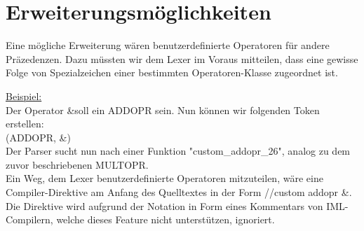 \documentclass[../main.tex]{subfiles}
\begin{document}
\section{Erweiterungsmöglichkeiten}

\vspace{10pt}

Eine mögliche Erweiterung wären benutzerdefinierte Operatoren für andere Präzedenzen. Dazu müssten wir dem Lexer im Voraus mitteilen, dass eine gewisse Folge von Spezialzeichen einer bestimmten Operatoren-Klasse zugeordnet ist. \\

\vspace{10pt}

\underline{Beispiel:} \\

Der Operator \dq\&\dq soll ein ADDOPR sein. Nun können wir folgenden Token erstellen: \\ 

(ADDOPR, \dq\&\dq) \\

Der Parser sucht nun nach einer Funktion "custom\_addopr\_26", analog zu dem zuvor beschriebenen MULTOPR. \\ 

Ein Weg, dem Lexer benutzerdefinierte Operatoren mitzuteilen, wäre eine Compiler-Direktive am Anfang des Quelltextes in der Form \dq//custom addopr \&\dq. \\ 

Die Direktive wird aufgrund der Notation in Form eines Kommentars von IML-Compilern, welche dieses Feature nicht unterstützen, ignoriert. 
\end{document}
